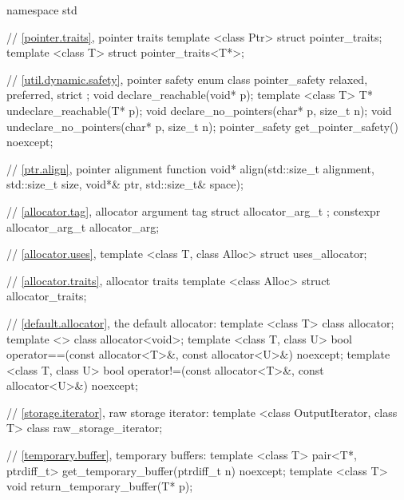%
\begin{codeblock}
namespace std {
  // \ref{pointer.traits}, pointer traits
  template <class Ptr> struct pointer_traits;
  template <class T> struct pointer_traits<T*>;

  // \ref{util.dynamic.safety}, pointer safety
  enum class pointer_safety { relaxed, preferred, strict };
  void declare_reachable(void* p);
  template <class T> T* undeclare_reachable(T* p);
  void declare_no_pointers(char* p, size_t n);
  void undeclare_no_pointers(char* p, size_t n);
  pointer_safety get_pointer_safety() noexcept;

  // \ref{ptr.align}, pointer alignment function
  void* align(std::size_t alignment, std::size_t size,
    void*& ptr, std::size_t& space);

  // \ref{allocator.tag}, allocator argument tag
  struct allocator_arg_t { };
  constexpr allocator_arg_t allocator_arg{};

  // \ref{allocator.uses}, 
  template <class T, class Alloc> struct uses_allocator;

  // \ref{allocator.traits}, allocator traits
  template <class Alloc> struct allocator_traits;

  // \ref{default.allocator}, the default allocator:
  template <class T> class allocator;
  template <> class allocator<void>;
  template <class T, class U>
    bool operator==(const allocator<T>&, const allocator<U>&) noexcept;
  template <class T, class U>
    bool operator!=(const allocator<T>&, const allocator<U>&) noexcept;

  // \ref{storage.iterator}, raw storage iterator:
  template <class OutputIterator, class T> class raw_storage_iterator;

  // \ref{temporary.buffer}, temporary buffers:
  template <class T>
    pair<T*, ptrdiff_t> get_temporary_buffer(ptrdiff_t n) noexcept;
  template <class T>
    void return_temporary_buffer(T* p);

}
\end{codeblock}
